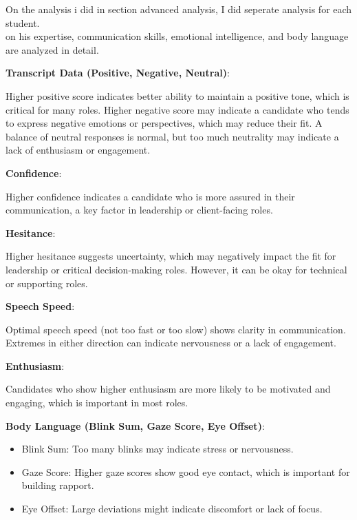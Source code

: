 \documentclass{article}
\begin{document}
On the analysis i did in section advanced analysis, I did seperate analysis for each student.\\
on his expertise, communication skills, emotional intelligence, and body language are analyzed in detail.\\

\large

\textbf{Transcript Data (Positive, Negative, Neutral)}:

Higher positive score indicates better ability to maintain a positive tone, which is critical for many roles.
Higher negative score may indicate a candidate who tends to express negative emotions or perspectives, which may reduce their fit.
A balance of neutral responses is normal, but too much neutrality may indicate a lack of enthusiasm or engagement.

\textbf{Confidence}:

Higher confidence indicates a candidate who is more assured in their communication, a key factor in leadership or client-facing roles.

\textbf{Hesitance}:


Higher hesitance suggests uncertainty, which may negatively impact the fit for leadership or critical decision-making roles. However, it can be okay for technical or supporting roles.

\textbf{Speech Speed}:

Optimal speech speed (not too fast or too slow) shows clarity in communication. Extremes in either direction can indicate nervousness or a lack of engagement.

\textbf{Enthusiasm}:

Candidates who show higher enthusiasm are more likely to be motivated and engaging, which is important in most roles.

\textbf{Body Language (Blink Sum, Gaze Score, Eye Offset)}:

\begin{itemize}
    \item Blink Sum: Too many blinks may indicate stress or nervousness.
    \item Gaze Score: Higher gaze scores show good eye contact, which is important for building rapport.
    \item Eye Offset: Large deviations might indicate discomfort or lack of focus.
\end{itemize}



\normalsize
\end{document}
